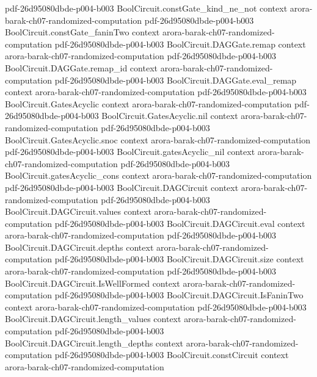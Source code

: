 \begin{theorem}
  {pdf-26d95080dbde-p004-b003}
\proofstep
  {BoolCircuit.constGate_kind_ne_not}
  {context}
  {arora-barak-ch07-randomized-computation}
  {pdf-26d95080dbde-p004-b003}
\proofstep
  {BoolCircuit.constGate_faninTwo}
  {context}
  {arora-barak-ch07-randomized-computation}
  {pdf-26d95080dbde-p004-b003}
\proofstep
  {BoolCircuit.DAGGate.remap}
  {context}
  {arora-barak-ch07-randomized-computation}
  {pdf-26d95080dbde-p004-b003}
\proofstep
  {BoolCircuit.DAGGate.remap_id}
  {context}
  {arora-barak-ch07-randomized-computation}
  {pdf-26d95080dbde-p004-b003}
\proofstep
  {BoolCircuit.DAGGate.eval_remap}
  {context}
  {arora-barak-ch07-randomized-computation}
  {pdf-26d95080dbde-p004-b003}
\proofstep
  {BoolCircuit.GatesAcyclic}
  {context}
  {arora-barak-ch07-randomized-computation}
  {pdf-26d95080dbde-p004-b003}
\proofstep
  {BoolCircuit.GatesAcyclic.nil}
  {context}
  {arora-barak-ch07-randomized-computation}
  {pdf-26d95080dbde-p004-b003}
\proofstep
  {BoolCircuit.GatesAcyclic.snoc}
  {context}
  {arora-barak-ch07-randomized-computation}
  {pdf-26d95080dbde-p004-b003}
\proofstep
  {BoolCircuit.gatesAcyclic_nil}
  {context}
  {arora-barak-ch07-randomized-computation}
  {pdf-26d95080dbde-p004-b003}
\proofstep
  {BoolCircuit.gatesAcyclic_cons}
  {context}
  {arora-barak-ch07-randomized-computation}
  {pdf-26d95080dbde-p004-b003}
\proofstep
  {BoolCircuit.DAGCircuit}
  {context}
  {arora-barak-ch07-randomized-computation}
  {pdf-26d95080dbde-p004-b003}
\proofstep
  {BoolCircuit.DAGCircuit.values}
  {context}
  {arora-barak-ch07-randomized-computation}
  {pdf-26d95080dbde-p004-b003}
\proofstep
  {BoolCircuit.DAGCircuit.eval}
  {context}
  {arora-barak-ch07-randomized-computation}
  {pdf-26d95080dbde-p004-b003}
\proofstep
  {BoolCircuit.DAGCircuit.depths}
  {context}
  {arora-barak-ch07-randomized-computation}
  {pdf-26d95080dbde-p004-b003}
\proofstep
  {BoolCircuit.DAGCircuit.size}
  {context}
  {arora-barak-ch07-randomized-computation}
  {pdf-26d95080dbde-p004-b003}
\proofstep
  {BoolCircuit.DAGCircuit.IsWellFormed}
  {context}
  {arora-barak-ch07-randomized-computation}
  {pdf-26d95080dbde-p004-b003}
\proofstep
  {BoolCircuit.DAGCircuit.IsFaninTwo}
  {context}
  {arora-barak-ch07-randomized-computation}
  {pdf-26d95080dbde-p004-b003}
\proofstep
  {BoolCircuit.DAGCircuit.length_values}
  {context}
  {arora-barak-ch07-randomized-computation}
  {pdf-26d95080dbde-p004-b003}
\proofstep
  {BoolCircuit.DAGCircuit.length_depths}
  {context}
  {arora-barak-ch07-randomized-computation}
  {pdf-26d95080dbde-p004-b003}
\proofstep
  {BoolCircuit.constCircuit}
  {context}
  {arora-barak-ch07-randomized-computation}

\end{theorem}
